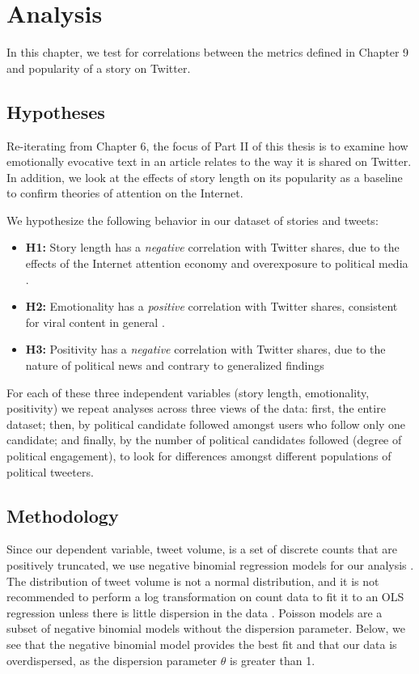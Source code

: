
\chapter{Analysis}
In this chapter, we test for correlations between the metrics defined in Chapter 9 and popularity of a story on Twitter.

\section{Hypotheses}
Re-iterating from Chapter 6, the focus of Part II of this thesis is to examine how emotionally evocative text in an article relates to the way it is shared on Twitter. In addition, we look at the effects of story length on its popularity as a baseline to confirm theories of attention on the Internet.

 
We hypothesize the following behavior in our dataset of stories and tweets:

\begin{itemize} 
    \item \textbf{H1:} Story length has a \emph{negative} correlation with Twitter shares, due to the effects of the Internet attention economy and overexposure to political media \cite{goldhaber1997attention}.
    \item \textbf{H2:} Emotionality has a \emph{positive} correlation with Twitter shares, consistent for viral content in general \cite{berger2012makes}.
    \item \textbf{H3:} Positivity has a \emph{negative} correlation with Twitter shares, due to the nature of political news and contrary to generalized findings \cite{berger2012makes}

\end{itemize}

For each of these three independent variables (story length, emotionality, positivity) we repeat analyses across three views of the data: first, the entire dataset; then, by political candidate followed amongst users who follow only one candidate; and finally, by the number of political candidates followed (degree of political engagement), to look for differences amongst different populations of political tweeters.


\section{Methodology}

Since our dependent variable, tweet volume, is a set of discrete counts that are positively truncated, we use negative binomial regression models for our analysis \cite{scott1997regression}. The distribution of tweet volume is not a normal distribution, and it is not recommended to perform a log transformation on count data to fit it to an OLS regression unless there is little dispersion in the data \cite{o2010not}. Poisson models are a subset of negative binomial models without the dispersion parameter. Below, we see that the negative binomial model provides the best fit and that our data is overdispersed, as the dispersion parameter $\theta$ is greater than 1.   

